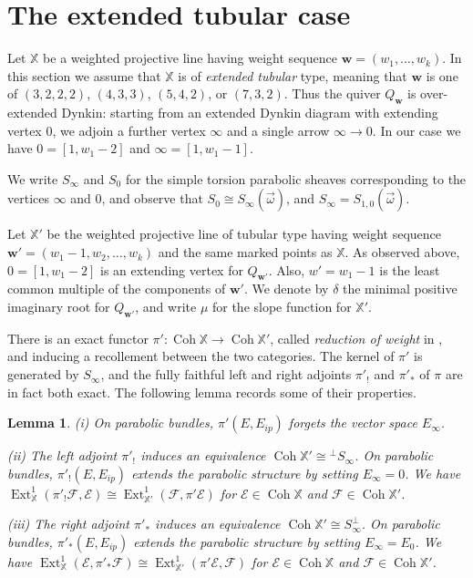 \documentclass[12pt,a4paper]{amsart}
\theoremstyle{plain}
\newtheorem{lem}[thm]{Lemma}
\DeclareMathOperator{\Coh}{Coh}
\DeclareMathOperator{\Ext}{Ext}
\newcommand{\F}{\mathcal F}
\newcommand{\E}{\mathcal E}
\newcommand{\XX}{\mathbb X}
\newcommand{\oom}{\vec{\omega}}
\newcommand{\bw}{\mathbf w}
\begin{document}
\section{The extended tubular case}
\label{s:exttub}

Let $\XX$ be a weighted projective line having weight sequence $\bw = (w_1,\dots,w_k)$. In this section we assume that $\XX$ is of \emph{extended tubular} type, meaning that $\bw$ is one of $(3,2,2,2)$, $(4,3,3)$, $(5,4,2)$, or $(7,3,2)$. Thus the quiver $Q_\bw$ is over-extended Dynkin: starting from an extended Dynkin diagram with extending vertex $0$, we adjoin a further vertex $\infty$ and a single arrow $\infty\to0$. In our case we have $0=[1,w_1-2]$ and $\infty=[1,w_1-1]$.

We write $S_\infty$ and $S_0$ for the simple torsion parabolic sheaves corresponding to the vertices $\infty$ and $0$, and observe that $S_0\cong S_\infty(\oom)$, and $S_\infty=S_{1,0}(\oom)$.

Let $\XX'$ be the weighted projective line of tubular type having weight sequence $\bw'=(w_1-1,w_2,\ldots,w_k)$ and the same marked points as $\XX$. As observed above, $0=[1,w_1-2]$ is an extending vertex for $Q_{\bw'}$. Also, $w'=w_1-1$ is the least common multiple of the components of $\bw'$. We denote by $\delta$ the minimal positive imaginary root for $Q_{\bw'}$, and write $\mu$ for the slope function for $\XX'$.

There is an exact functor $\pi'\colon\Coh\XX\to\Coh\XX'$, called \emph{reduction of weight} in \cite{GLperp}, and inducing a recollement between the two categories. The kernel of $\pi'$ is generated by $S_\infty$, and the fully faithful left and right adjoints $\pi'_!$ and $\pi'_\ast$ of $\pi$ are in fact both exact. The following lemma records some of their properties.

\begin{lem}
\label{l:recollement}
(i) On parabolic bundles, $\pi'(E,E_{ip})$ forgets the vector space $E_\infty$.

(ii) The left adjoint $\pi'_!$ induces an equivalence $\Coh\XX'\cong {}^\perp S_\infty$. On parabolic bundles, $\pi'_!(E,E_{ip})$ extends the parabolic structure by setting $E_\infty=0$. We have $\Ext^1_\XX(\pi'_!\F,\E) \cong \Ext^1_{\XX'}(\F,\pi'\E)$ for $\E\in\Coh\XX$ and $\F\in\Coh\XX'$.

(iii) The right adjoint $\pi'_\ast$ induces an equivalence $\Coh\XX'\cong S_\infty^\perp$. On parabolic bundles, $\pi'_\ast(E,E_{ip})$ extends the parabolic structure by setting $E_\infty=E_0$. We have $\Ext^1_\XX(\E,\pi'_\ast\F) \cong \Ext^1_{\XX'}(\pi'\E,\F)$ for $\E\in\Coh\XX$ and $\F\in\Coh\XX'$.
\end{lem}
\end{document}

